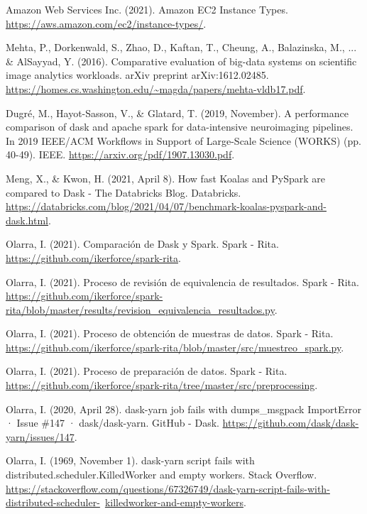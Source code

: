 \documentclass[11pt, oneside]{book}
\begin{document}
\begin{thebibliography}{111}
 Amazon Web Services Inc. (2021). Amazon EC2 Instance Types.  \url{https://aws.amazon.com/ec2/instance-types/}.

 Mehta, P., Dorkenwald, S., Zhao, D., Kaftan, T., Cheung, A., Balazinska, M., ... \& AlSayyad, Y. (2016). Comparative evaluation of big-data systems on scientific image analytics workloads. arXiv preprint arXiv:1612.02485. \url{https://homes.cs.washington.edu/~magda/papers/mehta-vldb17.pdf}. 

 Dugré, M., Hayot-Sasson, V., \& Glatard, T. (2019, November). A performance comparison of dask and apache spark for data-intensive neuroimaging pipelines. In 2019 IEEE/ACM Workflows in Support of Large-Scale Science (WORKS) (pp. 40-49). IEEE. \url{https://arxiv.org/pdf/1907.13030.pdf}.

 Meng, X., \& Kwon, H. (2021, April 8). How fast Koalas and PySpark are compared to Dask - The Databricks Blog. Databricks. \url{https://databricks.com/blog/2021/04/07/benchmark-koalas-pyspark-and-dask.html}. 

 Olarra, I. (2021). Comparación de Dask y Spark. Spark - Rita. \url{https://github.com/ikerforce/spark-rita}.

 Olarra, I. (2021). Proceso de revisión de equivalencia de resultados. Spark - Rita. \url{https://github.com/ikerforce/spark-rita/blob/master/results/revision_equivalencia_resultados.py}. 

 Olarra, I. (2021). Proceso de obtención de muestras de datos. Spark - Rita. \url{https://github.com/ikerforce/spark-rita/blob/master/src/muestreo_spark.py}.

 Olarra, I. (2021). Proceso de preparación de datos. Spark - Rita. \url{https://github.com/ikerforce/spark-rita/tree/master/src/preprocessing}.

 Olarra, I. (2020, April 28). dask-yarn job fails with dumps\_msgpack ImportError · Issue \#147 · dask/dask-yarn. GitHub - Dask. \url{https://github.com/dask/dask-yarn/issues/147}. 

 Olarra, I. (1969, November 1). dask-yarn script fails with distributed.scheduler.KilledWorker and empty workers. Stack Overflow. \url{https://stackoverflow.com/questions/67326749/dask-yarn-script-fails-with-distributed-scheduler-}\ \url{killedworker-and-empty-workers}. 



\end{thebibliography}
\end{document}
